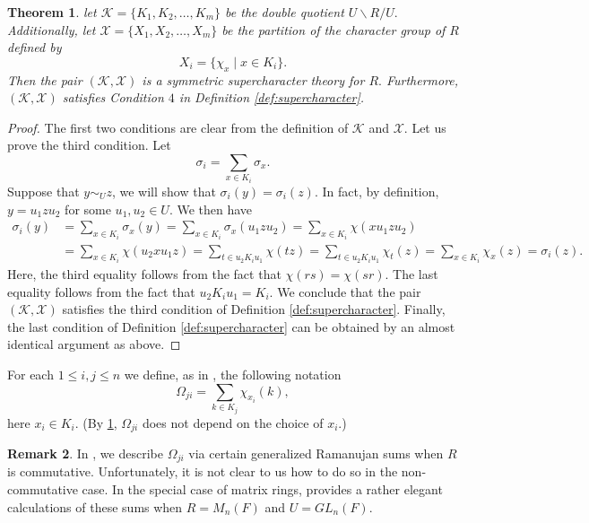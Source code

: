 \documentclass[12pt, a4paper]{amsart}
\newtheorem{thm}{Theorem}[section]
\theoremstyle{definition}
\newtheorem{rem}[thm]{Remark}
\numberwithin{equation}{section}
\begin{document}
\begin{thm} \label{prop:supercharacter-U}
let $\mathcal{K}=\{K_1, K_2, \ldots, K_m\}$ be the double quotient $U \backslash R \slash U.$ Additionally, let $\mathcal{X} = \{X_1, X_2, \ldots, X_m\}$ be the partition of the character group of $R$ defined by 
    \[ X_i = \{\chi_{x} \mid x \in K_i \}.\]
Then the pair $(\mathcal{K}, \mathcal{X})$ is a symmetric supercharacter theory for $R.$ Furthermore, $(\mathcal{K}, \mathcal{X})$ satisfies Condition $4$ in Definition \ref{def:supercharacter}.\end{thm}
\begin{proof}
    The first two conditions are clear from the definition of $\mathcal{K}$ and $\mathcal{X}.$ Let us prove the third condition. Let 
    \[ \sigma_i = \sum_{x \in K_i} \sigma_x.\]
Suppose that $y \sim_{U} z$, we will show that $\sigma_i(y)=\sigma_i(z).$ In fact, by definition, $y=u_1 z u_2$ for some $u_1, u_2 \in U.$ We then have 
\begin{align*}
\sigma_i(y) &= \sum_{x \in K_i} \sigma_x(y) = \sum_{x \in K_i} \sigma_x(u_1 z u_2) = \sum_{x \in K_i} \chi(xu_1 zu_2) \\ 
&= \sum_{x \in K_i} \chi(u_2 xu_1 z) = \sum_{t \in u_2 K_i u_1} \chi(tz) = \sum_{t \in u_2 K_i u_1} \chi_t(z) = \sum_{x \in K_i} \chi_x(z) = \sigma_i(z). 
\end{align*}
Here, the third equality follows from the fact that $\chi(rs)=\chi(sr)$. The last equality follows from the fact that $u_2K_iu_1 = K_i.$ We conclude that the pair $(\mathcal{K}, \mathcal{X})$ satisfies the third condition of Definition \ref{def:supercharacter}.  Finally, the last condition of Definition \ref{def:supercharacter} can be obtained by an almost identical argument as above. 
\end{proof}

For each $1 \leq i, j \leq n$ we define, as in \cite{nguyen2025supercharacters},  the following notation 
\[ \Omega_{ji} = \sum_{k \in K_j} \chi_{x_i} (k), \]
here $x_i \in K_i$. (By \cref{prop:supercharacter-U}, $\Omega_{ji}$ does not depend on the choice of $x_i.$) 

\begin{rem}

In \cite[Proposition 4.5]{nguyen2025supercharacters}, we describe $\Omega_{ji}$ via certain generalized Ramanujan sums when $R$ is commutative. Unfortunately, it is not clear to us how to do so in the non-commutative case. In the special case of matrix rings, \cite{chen2022unitary} provides a rather elegant calculations of these sums when $R=M_n(F)$ and $U=GL_n(F).$
    
\end{rem}
\end{document}
